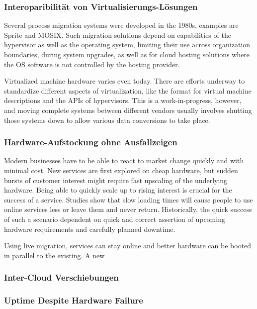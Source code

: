 \documentclass[draft,journal]{IEEEtran}
\begin{document}
\subsubsection{Interoparibilität von Virtualisierungs-Lösungen}
Several process migration systems were developed in the 1980s,
examples are Sprite and MOSIX\cite{hansen2004self}. Such migration
solutions depend on capabilities of the hypervisor as well as the
operating system, limiting their use across organization boundaries,
during system upgrades, as well as for cloud hosting solutions where
the OS software is not controlled by the hosting provider.

Virtualized machine hardware varies even today. There are efforts
underway\cite{cloudstandard} to standardize different aspects of
virtualization, like the format for virtual machine descriptions and
the APIs of hypervisors. This is a work-in-progress, however, and
moving complete systems between different vendors usually involves
shutting those systems down to allow various data conversions to take
place.

\subsubsection{Hardware-Aufstockung ohne Ausfallzeigen}
Modern businesses have to be able to react to market change quickly
and with minimal cost. New services are first explored on cheap
hardware\cite{tanenbaum1992modern}, but sudden bursts of customer
interest might require fast upscaling of the underlying
hardware. Being able to quickly scale up to rising interest is crucial
for the success of a service. Studies show that slow loading times
will cause people to use online services less or leave them and never
return\cite{kohavi2007online}. Historically, the quick success of such
a scenario dependent on quick and correct assertion of upcoming
hardware requirements and carefully planned downtime.

Using live migration, services can stay online and better hardware can
be booted in parallel to the existing. A new 

\subsubsection{Inter-Cloud Verschiebungen}
\label{sec:movclouds}


\subsubsection{Uptime Despite Hardware Failure}
\label{sec:hardfail}
\end{document}
